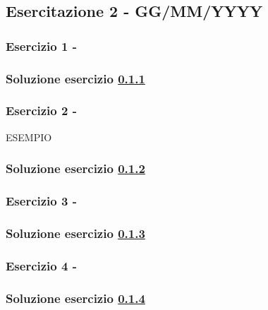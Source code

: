\documentclass[../main.tex]{subfiles}
\begin{document}
\clearpage
\thispagestyle{empty}
\vspace*{7cm}
\subsection{Esercitazione 2 - GG/MM/YYYY}
\vspace*{1.5cm}




\subsubsection{Esercizio 1 - }
\label{e2e1}

\subsubsection*{Soluzione esercizio \ref{e2e1}}



\vspace*{1.5cm}
\subsubsection{Esercizio 2 - }
\label{e2e2}

ESEMPIO

\subsubsection*{Soluzione esercizio \ref{e2e2}}

\vspace*{1.5cm}
\subsubsection{Esercizio 3 - }
\label{e2e3}

\subsubsection*{Soluzione esercizio \ref{e2e3}}

\vspace*{1.5cm}
\subsubsection{Esercizio 4 - }
\label{e2e4}

\subsubsection*{Soluzione esercizio \ref{e2e4}}
\end{document}
